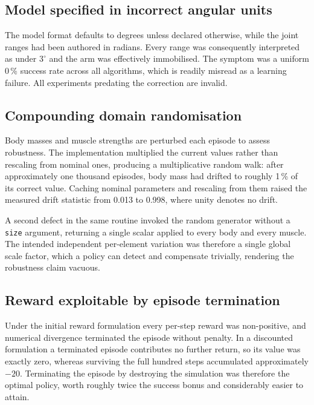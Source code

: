\subsection{Model specified in incorrect angular units}

The \MuJoCo{} model format defaults to degrees unless declared otherwise, while
the joint ranges had been authored in radians. Every range was consequently
interpreted as under $3^{\circ}$ and the arm was effectively immobilised. The
symptom was a uniform 0\,\% success rate across all algorithms, which is readily
misread as a learning failure. All experiments predating the correction are
invalid.

\subsection{Compounding domain randomisation}

Body masses and muscle strengths are perturbed each episode to assess robustness.
The implementation multiplied the current values rather than rescaling from
nominal ones, producing a multiplicative random walk: after approximately one
thousand episodes, body mass had drifted to roughly 1\,\% of its correct value.
Caching nominal parameters and rescaling from them raised the measured drift
statistic from 0.013 to 0.998, where unity denotes no drift.

A second defect in the same routine invoked the random generator without a
\texttt{size} argument, returning a single scalar applied to every body and every
muscle. The intended independent per-element variation was therefore a single
global scale factor, which a policy can detect and compensate trivially, rendering
the robustness claim vacuous.

\subsection{Reward exploitable by episode termination}
\label{sec:exploit}

Under the initial reward formulation every per-step reward was non-positive, and
numerical divergence terminated the episode without penalty. In a discounted
formulation a terminated episode contributes no further return, so its value was
exactly zero, whereas surviving the full hundred steps accumulated approximately
$-20$. Terminating the episode by destroying the simulation was therefore the
optimal policy, worth roughly twice the success bonus and considerably easier to
attain.


